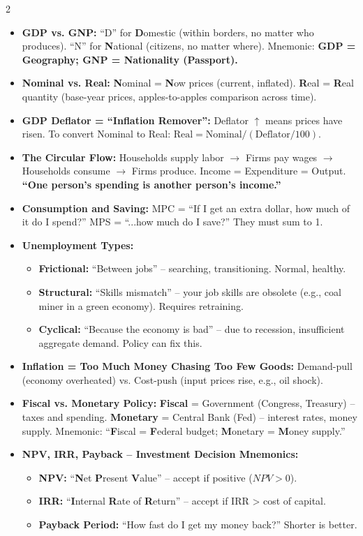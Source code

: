\documentclass[10pt,a4paper]{article}
\begin{document}
\begin{multicols}{2}
\begin{itemize}[leftmargin=*,nosep]
    \item \textbf{GDP vs. GNP:} ``D'' for \textbf{D}omestic (within borders, no matter who produces). ``N'' for \textbf{N}ational (citizens, no matter where). Mnemonic: \textbf{GDP = Geography; GNP = Nationality (Passport).}
    \item \textbf{Nominal vs. Real:} \textbf{N}ominal = \textbf{N}ow prices (current, inflated). \textbf{R}eal = \textbf{R}eal quantity (base-year prices, apples-to-apples comparison across time).
    \item \textbf{GDP Deflator = ``Inflation Remover'':} Deflator $\uparrow$ means prices have risen. To convert Nominal to Real: $\text{Real} = \text{Nominal} / (\text{Deflator} / 100)$.
    \item \textbf{The Circular Flow:} Households supply labor $\to$ Firms pay wages $\to$ Households consume $\to$ Firms produce. Income = Expenditure = Output. \textbf{``One person's spending is another person's income.''}
    \item \textbf{Consumption and Saving:} MPC = ``If I get an extra dollar, how much of it do I spend?'' MPS = ``...how much do I save?'' They must sum to 1.
    \item \textbf{Unemployment Types:}
    \begin{itemize}[nosep]
        \item \textbf{Frictional:} ``Between jobs'' -- searching, transitioning. Normal, healthy.
        \item \textbf{Structural:} ``Skills mismatch'' -- your job skills are obsolete (e.g., coal miner in a green economy). Requires retraining.
        \item \textbf{Cyclical:} ``Because the economy is bad'' -- due to recession, insufficient aggregate demand. Policy can fix this.
    \end{itemize}
    \item \textbf{Inflation = Too Much Money Chasing Too Few Goods:} Demand-pull (economy overheated) vs. Cost-push (input prices rise, e.g., oil shock).
    \item \textbf{Fiscal vs. Monetary Policy:} \textbf{Fiscal} = Government (Congress, Treasury) -- taxes and spending. \textbf{Monetary} = Central Bank (Fed) -- interest rates, money supply. Mnemonic: ``\textbf{F}iscal = \textbf{F}ederal budget; \textbf{M}onetary = \textbf{M}oney supply.''
    \item \textbf{NPV, IRR, Payback -- Investment Decision Mnemonics:}
    \begin{itemize}[nosep]
        \item \textbf{NPV:} ``\textbf{N}et \textbf{P}resent \textbf{V}alue'' -- accept if positive ($NPV > 0$).
        \item \textbf{IRR:} ``\textbf{I}nternal \textbf{R}ate of \textbf{R}eturn'' -- accept if IRR > cost of capital.
        \item \textbf{Payback Period:} ``How fast do I get my money back?'' Shorter is better.
    \end{itemize}
\end{itemize}


\end{multicols}
\end{document}
